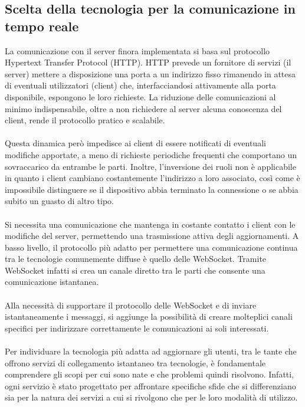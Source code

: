 \subsection{Scelta della tecnologia per la comunicazione in tempo reale}
La comunicazione con il server finora implementata 
si basa sul protocollo Hypertext Transfer Protocol (HTTP). 
HTTP prevede un fornitore di servizi (il server) mettere a disposizione una porta 
a un indirizzo fisso rimanendo in attesa di eventuali utilizzatori (client) che, 
interfacciandosi attivamente alla porta disponibile, espongono le loro richieste.
La riduzione delle comunicazioni al minimo indispensabile, 
oltre a non richiedere al server alcuna conoscenza del client, 
rende il protocollo pratico e scalabile.\\
\\
Questa dinamica però impedisce ai client di essere notificati di eventuali modifiche apportate, 
a meno di richieste periodiche frequenti che comportano un sovraccarico da entrambe le parti. 
Inoltre, l’inversione dei ruoli non è applicabile 
in quanto i client cambiano costantemente l’indirizzo a loro associato, 
così come è impossibile distinguere se il dispositivo abbia terminato la connessione
o se abbia subito un guasto di altro tipo. \\
\\
Si necessita una comunicazione che mantenga in costante contatto 
i client con le modifiche del server, 
permettendo una trasmissione attiva degli aggiornamenti.
A basso livello, il protocollo più adatto per permettere una comunicazione continua 
tra le tecnologie comunemente diffuse è quello delle WebSocket. 
Tramite WebSocket infatti si crea un canale diretto tra le parti 
che consente una comunicazione istantanea.\\
\\
Alla necessità di supportare il protocollo delle WebSocket e di inviare istantaneamente i messaggi,
si aggiunge la possibilità di creare molteplici canali specifici 
per indirizzare correttamente le comunicazioni ai soli interessati.\\
\\
Per individuare la tecnologia più adatta ad aggiornare gli utenti, 
tra le tante che offrono servizi di collegamento istantaneo tra tecnologie, 
è fondamentale comprendere  gli scopi per cui sono nate e che problemi quindi risolvono. 
Infatti, ogni servizio è stato progettato per affrontare specifiche sfide che si differenziano 
sia per la natura dei servizi a cui si rivolgono che per le loro modalità di utilizzo.\\
